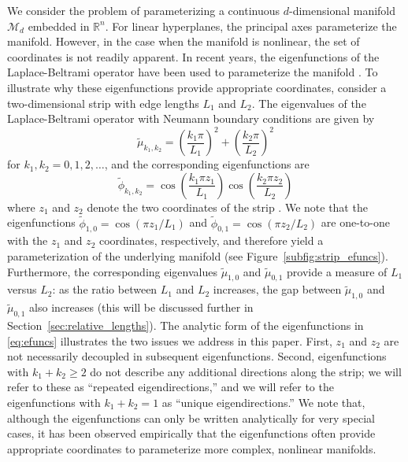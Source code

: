 \documentclass[3p]{elsarticle}
\begin{document}
We consider the problem of parameterizing a continuous $d$-dimensional manifold $\mathcal{M}_d$ embedded in $\mathbb{R}^n$.
%
For linear hyperplanes, the principal axes parameterize the manifold.
%
However, in the case when the manifold is nonlinear, the set of coordinates is not readily apparent. 
%
In recent years, the eigenfunctions of the Laplace-Beltrami operator have been used to parameterize the manifold \cite{Belkin2003, coifman2005geometric, singer2008non}. 
%
To illustrate why these eigenfunctions provide appropriate coordinates, consider a two-dimensional strip with edge lengths $L_1$ and $L_2$. 
%
The eigenvalues of the Laplace-Beltrami operator with Neumann boundary conditions are given by
\begin{equation} \label{eq:evals}
\tilde{\mu}_{k_1, k_2} = \left( \frac{k_1 \pi}{L_1} \right)^2 + \left( \frac{k_2 \pi}{L_2} \right)^2
\end{equation}
for $k_1, k_2 = 0, 1, 2, \dots$,
and the corresponding eigenfunctions are 
\begin{equation} \label{eq:efuncs}
\tilde{\phi}_{k_1, k_2} = \cos \left( \frac{k_1 \pi z_1}{L_1} \right) \cos \left( \frac{k_2 \pi z_2}{L_2} \right)
\end{equation}
where $z_1$ and $z_2$ denote the two coordinates of the strip \cite{singer2008non}. 
%
We note that the eigenfunctions $\tilde{\phi}_{1, 0} = \cos \left( {\pi z_1}/{L_1} \right)$ and $\tilde{\phi}_{0, 1} = \cos \left( {\pi z_2}/{L_2} \right)$ are one-to-one with the $z_1$ and $z_2$ coordinates, respectively, and therefore yield a parameterization of the underlying manifold (see Figure~\ref{subfig:strip_efuncs}). 
%
Furthermore, the corresponding eigenvalues $\tilde{\mu}_{1,0}$ and $\tilde{\mu}_{0,1}$ provide a measure of $L_1$ versus $L_2$: as the ratio between $L_1$ and $L_2$ increases, the gap between $\tilde{\mu}_{1,0}$ and $\tilde{\mu}_{0,1}$ also increases (this will be discussed further in Section~\ref{sec:relative_lengths}).
%
The analytic form of the eigenfunctions in \eqref{eq:efuncs} illustrates the two issues we address in this paper. 
%
First, $z_1$ and $z_2$ are not necessarily decoupled in subsequent eigenfunctions. 
%
Second, eigenfunctions with $k_1+k_2 \ge 2$ do not describe any additional directions along the strip; we will refer to these as ``repeated eigendirections,'' and we will refer to the eigenfunctions with $k_1+k_2 =1$ as ``unique eigendirections.''
%
We note that, although the eigenfunctions can only be written analytically for very special cases, it has been observed empirically that the eigenfunctions often provide appropriate coordinates to parameterize more complex, nonlinear manifolds. 
\end{document}
